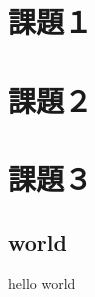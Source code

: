\documentclass[a4paper]{jsarticle}
\begin{document}
\section*{課題１}
\section*{課題２}
\section*{課題３}
\subsection{world}
hello world


\begin{thebibliography}{1}


\end{thebibliography}

\end{document}
